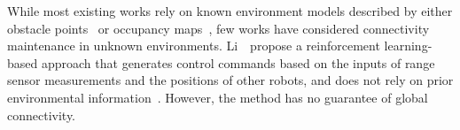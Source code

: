 While most existing works rely on known environment models described by either obstacle points~\cite{robuffogiordano_PassivitybasedDecentralized_2013, yang_MinimallyConstrained_2023} or occupancy maps~\cite{stump_VisibilitybasedDeployment_2011, xia_RELINKRealTime_2023},
few works have considered connectivity maintenance in unknown environments.
Li~\etal~propose a reinforcement learning-based approach that generates control commands based on the inputs of range sensor measurements and the positions of other robots, and does not rely on prior environmental information~\cite{li_DecentralizedGlobal_2022}.
However, the method has no guarantee of global connectivity.
